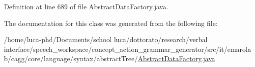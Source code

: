 Definition at line 689 of file Abstract\-Data\-Factory.\-java.



The documentation for this class was generated from the following file\-:\begin{DoxyCompactItemize}
\item 
/home/luca-\/phd/\-Documents/school luca/dottorato/research/verbal interface/speech\-\_\-workspace/concept\-\_\-action\-\_\-grammar\-\_\-generator/src/it/emarolab/cagg/core/language/syntax/abstract\-Tree/\hyperlink{AbstractDataFactory_8java}{Abstract\-Data\-Factory.\-java}\end{DoxyCompactItemize}
